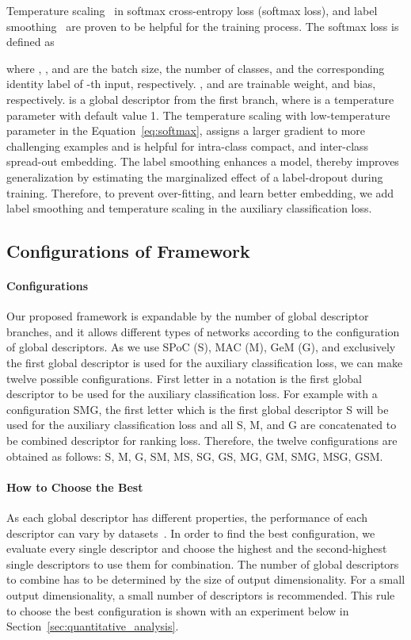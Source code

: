 \documentclass[10pt,twocolumn,letterpaper]{article}
\begin{document}
\begin{CJK}{UTF8}{mj}
Temperature scaling~\cite{guo2017calibration, zhang2018Heated} in softmax cross-entropy loss (softmax loss), and label smoothing~\cite{szegedy2016rethinking} are proven to be helpful for the training process.
The softmax loss is defined as

where , , and  are the batch size, the number of classes, and the corresponding identity label of -th input, respectively.
, and  are trainable weight, and bias, respectively.
 is a global descriptor from the first branch, where  is a temperature parameter with default value 1.
The temperature scaling with low-temperature parameter  in the Equation~\ref{eq:softmax}, assigns a larger gradient to more challenging examples and is helpful for intra-class compact, and inter-class spread-out embedding.
The label smoothing enhances a model, thereby improves generalization by estimating the marginalized effect of a label-dropout during training.
Therefore, to prevent over-fitting, and learn better embedding, we add label smoothing and temperature scaling in the auxiliary classification loss.

\subsection{Configurations of Framework} \label{sec:configurations_of_framework}
\paragraph{Configurations}
Our proposed framework is expandable by the number of global descriptor branches, and it allows different types of networks according to the configuration of global descriptors.
As we use SPoC (S), MAC (M), GeM (G), and exclusively the first global descriptor is used for the auxiliary classification loss, we can make twelve possible configurations.
First letter in a notation is the first global descriptor to be used for the auxiliary classification loss.
For example with a configuration SMG, the first letter which is the first global descriptor S will be used for the auxiliary classification loss and all S, M, and G are concatenated to be combined descriptor for ranking loss.
Therefore, the twelve configurations are obtained as follows: S, M, G, SM, MS, SG, GS, MG, GM, SMG, MSG, GSM.

\vspace{-4mm}
\paragraph{How to Choose the Best}
As each global descriptor has different properties, the performance of each descriptor can vary by datasets~\cite{boureau2010theoretical}.
In order to find the best configuration, we evaluate every single descriptor and choose the highest and the second-highest single descriptors to use them for combination.
The number of global descriptors to combine has to be determined by the size of output dimensionality.
For a small output dimensionality, a small number of descriptors is recommended.
This rule to choose the best configuration is shown with an experiment below in Section~\ref{sec:quantitative_analysis}.



\end{CJK}
\end{document}
